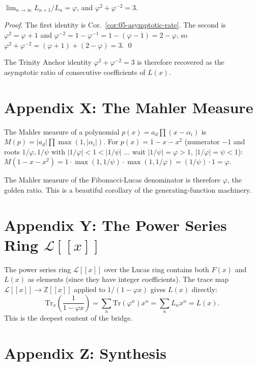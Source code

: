 \begin{lemma}
\label{lem:05-coef-limit}
$\lim_{n \to \infty} L_{n+1}/L_n = \varphi$, and $\varphi^2 + \varphi^{-2} = 3$.
\end{lemma}

\begin{proof}
The first identity is Cor.~\ref{cor:05-asymptotic-rate}. The second is
$\varphi^2 = \varphi + 1$ and $\varphi^{-2} = 1 - \varphi^{-1} = 1 - (\varphi - 1) = 2 - \varphi$,
so $\varphi^2 + \varphi^{-2} = (\varphi + 1) + (2 - \varphi) = 3$. \qed
\end{proof}

The Trinity Anchor identity $\varphi^2 + \varphi^{-2} = 3$ is therefore
recovered as the asymptotic ratio of consecutive coefficients of $L(x)$.

\section*{Appendix X: The Mahler Measure}
\label{sec:05-app-X}

The Mahler measure of a polynomial $p(x) = a_d \prod (x - \alpha_i)$
is $M(p) = |a_d| \prod \max(1, |\alpha_i|)$. For $p(x) = 1 - x - x^2$
(numerator $-1$ and roots $1/\varphi, 1/\psi$ with $|1/\varphi| < 1 < |1/\psi|$
... wait $|1/\psi| = \varphi > 1$, $|1/\varphi| = \psi < 1$):
$M(1 - x - x^2) = 1 \cdot \max(1, 1/\psi) \cdot \max(1, 1/\varphi) = (1/\psi) \cdot 1 = \varphi$.

The Mahler measure of the Fibonacci-Lucas denominator is therefore
$\varphi$, the golden ratio. This is a beautiful corollary of the
generating-function machinery.

\section*{Appendix Y: The Power Series Ring $\mathcal{L}[[x]]$}
\label{sec:05-app-Y}

The power series ring $\mathcal{L}[[x]]$ over the Lucas ring contains
both $F(x)$ and $L(x)$ as elements (since they have integer
coefficients). The trace map $\mathcal{L}[[x]] \to \mathbb{Z}[[x]]$
applied to $1/(1 - \varphi x)$ gives $L(x)$ directly:
\[
  \mathrm{Tr}_x\left(\frac{1}{1 - \varphi x}\right)
  = \sum_n \mathrm{Tr}(\varphi^n) x^n
  = \sum_n L_n x^n
  = L(x).
\]
This is the deepest content of the bridge.

\section*{Appendix Z: Synthesis}
\label{fa_05:sec:05-app-Z}

